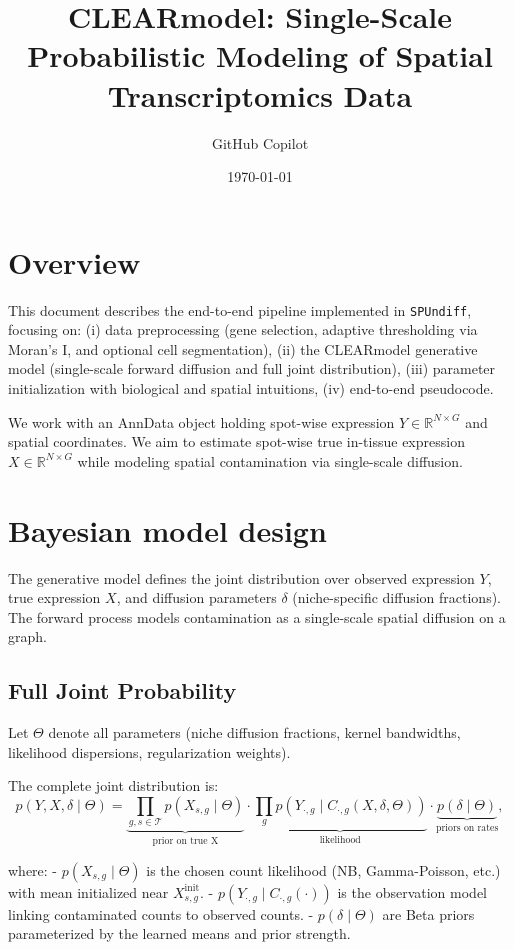 \documentclass[11pt]{article}
\title{CLEARmodel: Single-Scale Probabilistic Modeling of Spatial Transcriptomics Data}
\author{GitHub Copilot}
\date{\today}
\begin{document}
\maketitle

\section{Overview}
This document describes the end-to-end pipeline implemented in \texttt{SPUndiff}, focusing on:
(i) data preprocessing (gene selection, adaptive thresholding via Moran's I, and optional cell segmentation),
(ii) the CLEARmodel generative model (single-scale forward diffusion and full joint distribution),
(iii) parameter initialization with biological and spatial intuitions,
(iv) end-to-end pseudocode.

We work with an AnnData object holding spot-wise expression $Y\in\mathbb{R}^{N\times G}$ and spatial coordinates. We aim to estimate spot-wise true in-tissue expression $X\in\mathbb{R}^{N\times G}$ while modeling spatial contamination via single-scale diffusion.

\section{Bayesian model design}

The generative model defines the joint distribution over observed expression $Y$, true expression $X$, and diffusion parameters $\delta$ (niche-specific diffusion fractions). The forward process models contamination as a single-scale spatial diffusion on a graph.

\subsection{Full Joint Probability}

Let $\Theta$ denote all parameters (niche diffusion fractions, kernel bandwidths, likelihood dispersions, regularization weights).

The complete joint distribution is:
\[
p(Y, X, \delta \mid \Theta) = \underbrace{\prod_{g,s \in \mathcal{T}} p(X_{s,g} \mid \Theta)}_{\text{prior on true X}} \cdot \underbrace{\prod_{g} p(Y_{\cdot,g} \mid C_{\cdot,g}(X, \delta, \Theta))}_{\text{likelihood}} \cdot \underbrace{p(\delta \mid \Theta)}_{\text{priors on rates}},
\]

where:
- $p(X_{s,g} \mid \Theta)$ is the chosen count likelihood (NB, Gamma-Poisson, etc.) with mean initialized near $X^{\text{init}}_{s,g}$.
- $p(Y_{\cdot,g} \mid C_{\cdot,g}(\cdot))$ is the observation model linking contaminated counts to observed counts.
- $p(\delta \mid \Theta)$ are Beta priors parameterized by the learned means and prior strength.
\end{document}
